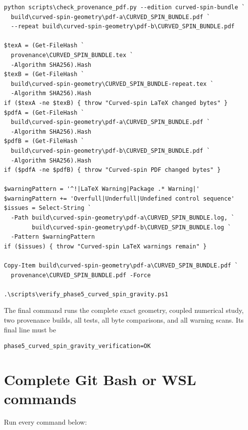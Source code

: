\documentclass[11pt]{article}
\begin{document}
\begin{Verbatim}[fontsize=\small]
python scripts\check_provenance_pdf.py --edition curved-spin-bundle `
  build\curved-spin-geometry\pdf-a\CURVED_SPIN_BUNDLE.pdf `
  --repeat build\curved-spin-geometry\pdf-b\CURVED_SPIN_BUNDLE.pdf

$texA = (Get-FileHash `
  provenance\CURVED_SPIN_BUNDLE.tex `
  -Algorithm SHA256).Hash
$texB = (Get-FileHash `
  build\curved-spin-geometry\CURVED_SPIN_BUNDLE-repeat.tex `
  -Algorithm SHA256).Hash
if ($texA -ne $texB) { throw "Curved-spin LaTeX changed bytes" }
$pdfA = (Get-FileHash `
  build\curved-spin-geometry\pdf-a\CURVED_SPIN_BUNDLE.pdf `
  -Algorithm SHA256).Hash
$pdfB = (Get-FileHash `
  build\curved-spin-geometry\pdf-b\CURVED_SPIN_BUNDLE.pdf `
  -Algorithm SHA256).Hash
if ($pdfA -ne $pdfB) { throw "Curved-spin PDF changed bytes" }

$warningPattern = '^!|LaTeX Warning|Package .* Warning|'
$warningPattern += 'Overfull|Underfull|Undefined control sequence'
$issues = Select-String `
  -Path build\curved-spin-geometry\pdf-a\CURVED_SPIN_BUNDLE.log, `
        build\curved-spin-geometry\pdf-b\CURVED_SPIN_BUNDLE.log `
  -Pattern $warningPattern
if ($issues) { throw "Curved-spin LaTeX warnings remain" }

Copy-Item build\curved-spin-geometry\pdf-a\CURVED_SPIN_BUNDLE.pdf `
  provenance\CURVED_SPIN_BUNDLE.pdf -Force

.\scripts\verify_phase5_curved_spin_gravity.ps1
\end{Verbatim}

The final command runs the complete exact geometry, coupled numerical study, two provenance builds, all tests, all byte comparisons, and all warning scans. Its final line must be

\begin{Verbatim}[fontsize=\small]
phase5_curved_spin_gravity_verification=OK
\end{Verbatim}

\section{Complete Git Bash or WSL commands}

Run every command below:
\end{document}
